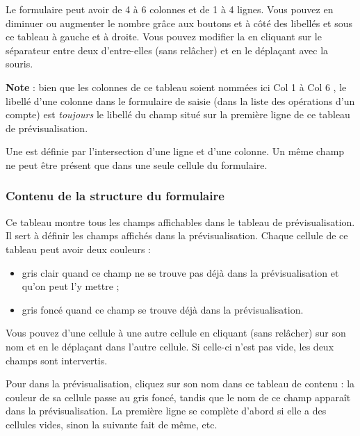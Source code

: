 Le formulaire peut avoir de 4 à 6 colonnes et de 1 à 4 lignes. Vous pouvez en diminuer ou augmenter le nombre grâce aux boutons  et  à côté des libellés  et  sous ce tableau à gauche et à droite. Vous pouvez modifier la  en cliquant sur le séparateur entre deux d'entre-elles (sans relâcher) et en le déplaçant avec la souris.

\textbf{Note} : bien que les colonnes de ce tableau soient nommées ici \og Col 1 \fg{} à \og Col 6 \fg{}, le libellé d'une colonne dans le formulaire de saisie (dans la liste des opérations d'un compte) est \emph{toujours} le libellé du champ situé sur la première ligne de ce tableau de prévisualisation.
 
Une  est définie par l'intersection d'une ligne et d'une colonne. Un même champ ne peut être présent que dans une seule cellule du formulaire.


\subsubsection{Contenu de la structure du formulaire\label{setup-form-content-fields}}

Ce tableau montre tous les champs affichables dans le tableau de prévisualisation. Il sert à définir les champs affichés dans la prévisualisation. Chaque cellule de ce tableau peut avoir deux couleurs :

\begin{itemize}
	\item gris clair quand ce champ ne se trouve pas déjà dans la prévisualisation et qu'on peut l'y mettre ;
	\item gris foncé quand ce champ se trouve déjà dans la prévisualisation.
\end{itemize}

Vous pouvez  d'une cellule à une autre cellule en cliquant (sans relâcher) sur son nom et en le déplaçant dans l'autre cellule. Si celle-ci n'est pas vide, les deux champs sont intervertis.

Pour  dans la prévisualisation, cliquez sur son nom dans ce tableau de contenu : la couleur de sa cellule passe au gris foncé, tandis que le nom de ce champ apparaît dans la prévisualisation. La première ligne se complète d'abord si elle a des cellules vides, sinon la suivante fait de même, etc.

